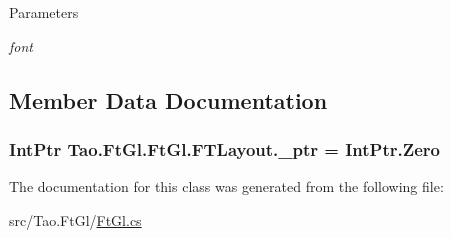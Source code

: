 \begin{DoxyParams}{Parameters}
\item[{\em font}]\end{DoxyParams}


\subsection{Member Data Documentation}
\hypertarget{class_tao_1_1_ft_gl_1_1_ft_gl_1_1_f_t_layout_a55470340a991aad252c8cd5d29071fe7}{
\subsubsection[{\_\-ptr}]{\setlength{\rightskip}{0pt plus 5cm}IntPtr {\bf Tao.FtGl.FtGl.FTLayout.\_\-ptr} = IntPtr.Zero}}
\label{class_tao_1_1_ft_gl_1_1_ft_gl_1_1_f_t_layout_a55470340a991aad252c8cd5d29071fe7}


The documentation for this class was generated from the following file:\begin{DoxyCompactItemize}
\item 
src/Tao.FtGl/\hyperlink{_ft_gl_8cs}{FtGl.cs}\end{DoxyCompactItemize}
